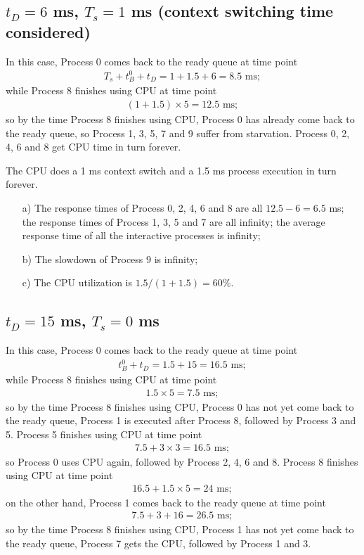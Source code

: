 \documentclass[12pt,letterpaper]{article}
\begin{document}
\subsection{$t_D=6$ ms, $T_s = 1$ ms (context switching time considered)} 
In this case, Process 0 comes back to the ready queue at time point
\begin{eqnarray}
T_s+t_B^0+t_D=1+1.5+6=8.5\textrm{ ms};
\end{eqnarray}
while Process 8 finishes using CPU at time point 
\begin{eqnarray}
(1+1.5)\times5=12.5\textrm{ ms};
\end{eqnarray}
so by the time Process 8 finishes using CPU, Process 0 has already come back to the ready queue, so Process 1, 3, 5, 7 and 9 suffer from starvation. Process 0, 2, 4, 6 and 8 get CPU time in turn forever.

The CPU does a 1 ms context switch and a 1.5 ms process execution in turn forever.

\begin{enumerate}
\item[a)] The response times of Process 0, 2, 4, 6 and 8 are all $12.5-6=6.5$ ms; the response times of Process 1, 3, 5 and 7 are all infinity; the average response time of all the interactive processes is infinity;
\item[b)] The slowdown of Process 9 is infinity;
\item[c)] The CPU utilization is $1.5/(1+1.5)=60\%$.
\end{enumerate}

\subsection{$t_D=15$ ms, $T_s = 0$ ms}
In this case, Process 0 comes back to the ready queue at time point
\begin{eqnarray}
t_B^0+t_D=1.5+15=16.5\textrm{ ms};
\end{eqnarray}
while Process 8 finishes using CPU at time point 
\begin{eqnarray}
1.5\times5=7.5\textrm{ ms};
\end{eqnarray}
so by the time Process 8 finishes using CPU, Process 0 has not yet come back to the ready queue, Process 1 is executed after Process 8, followed by Process 3 and 5. Process 5 finishes using CPU at time point
\begin{eqnarray}
7.5+3\times3=16.5\textrm{ ms};
\end{eqnarray}
so Process 0 uses CPU again, followed by Process 2, 4, 6 and 8. Process 8 finishes using CPU at time point
\begin{eqnarray}
16.5+1.5\times5=24\textrm{ ms};
\end{eqnarray}
on the other hand, Process 1 comes back to the ready queue at time point
\begin{eqnarray}
7.5+3+16=26.5\textrm{ ms};
\end{eqnarray}
so by the time Process 8 finishes using CPU, Process 1 has not yet come back to the ready queue, Process 7 gets the CPU, followed by Process 1 and 3.
\end{document}
